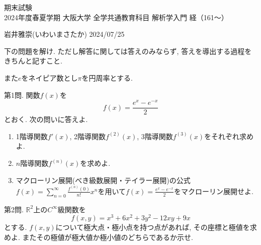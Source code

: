 \documentclass[dvipdfmx,a4paper,11pt]{article}
\newcommand{\R}{\mathbb{R}}
\theoremstyle{definition}
\begin{document}
\pagestyle{empty}



\begin{center}
{\LARGE 期末試験} \\

{2024年度春夏学期 大阪大学 全学共通教育科目 解析学入門 経（161〜）}
\end{center}

\begin{flushright}
 岩井雅崇(いわいまさたか) 2024/07/25
\end{flushright}



  
  \begin{center}
下の問題を解け.  ただし解答に関しては答えのみならず, 答えを導出する過程をきちんと記すこと. 

また$e$をネイピア数とし$\pi$を円周率とする.
  \end{center}
  
  \vspace{11pt}
{\Large 第1問.} 
\vspace{11pt}
関数$f(x)$を
$$f(x) = \frac{e^{x} - e^{-x}}{2}$$
とおく. 次の問いに答えよ.
 
 \begin{enumerate}
    \item 1階導関数$f'(x)$, 2階導関数$f^{(2)}(x)$, 3階導関数$f^{(3)}(x)$をそれぞれ求めよ.
    \item $n$階導関数$f^{(n)}(x)$を求めよ.
    \item マクローリン展開(べき級数展開・テイラー展開)の公式$f(x) = \sum_{n=0}^{\infty}\frac{f^{(n)}(0)}{n!} x^{n}$を用いて$f(x)=\frac{e^{x} - e^{-x}}{2}$をマクローリン展開せよ. 
\end{enumerate}


   \vspace{14pt}
{\Large 第2問.} 
$\R^2$上の$C^\infty$級関数を
$$f(x,y) = x^3+6x^2+3y^2-12xy+9x$$
とする.
$f(x,y) $について極大点・極小点を持つ点があれば, その座標と極値を求めよ. またその極値が極大値か極小値のどちらであるか示せ.
  
\end{document}
